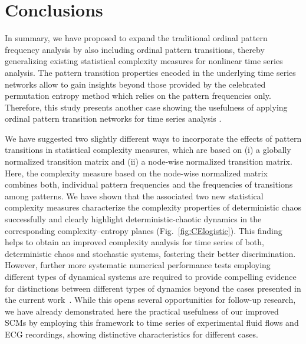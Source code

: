 \documentclass[12pt,aip,cha,reprint,nofootinbib]{revtex4-1}
\begin{document}
\section{Conclusions} \label{sec:con}
In summary, we have proposed to expand the traditional ordinal pattern frequency analysis by also including ordinal pattern transitions, thereby generalizing existing statistical complexity measures for nonlinear time series analysis. The pattern transition properties encoded in the underlying time series networks allow to gain insights beyond those provided by the celebrated permutation entropy method which relies on the pattern frequencies only. Therefore, this study presents another case showing the usefulness of applying ordinal pattern transition networks for time series analysis \cite{ZouPR2018}. 

We have suggested two slightly different ways to incorporate the effects of pattern transitions in statistical complexity measures, which are based on (i) a globally normalized transition matrix and (ii) a node-wise normalized transition matrix. Here, the complexity measure based on the node-wise normalized matrix combines both, individual pattern frequencies and the frequencies of transitions among patterns. We have shown that the associated two new statistical complexity measures characterize the complexity properties of deterministic chaos successfully and clearly highlight deterministic-chaotic dynamics in the corresponding complexity--entropy planes (Fig.~\ref{fig:CElogistic}). This finding helps to obtain an improved complexity analysis for time series of both, deterministic chaos and stochastic systems, fostering their better discrimination. However, further more systematic numerical performance tests employing different types of dynamical systems are required to provide compelling evidence for distinctions between different types of dynamics beyond the cases presented in the current work~\cite{BorgesAMC2019,RossoPRE2007}. While this opens several opportunities for follow-up research, we have already demonstrated here the practical usefulness of our improved SCMs by employing this framework to time series of experimental fluid flows and ECG recordings, showing distinctive characteristics for different cases. 
\end{document}
